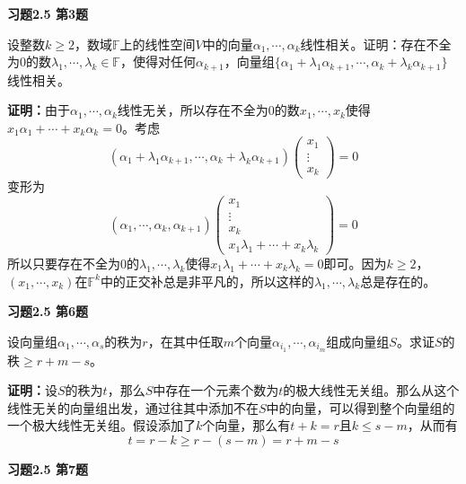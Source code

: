 \renewcommand{\newpageorvspace}{\vspace{2em}}

\date{第五次作业}



\maketitle

{\bf 习题2.5 第3题}

设整数$k\geqslant 2$，数域$\mathbb{F}$上的线性空间$V$中的向量$\alpha_1,\cdots, \alpha_k$线性相关。证明：存在不全为0的数$\lambda_1,\cdots,\lambda_k\in \mathbb{F}$，使得对任何$\alpha_{k+1}$，向量组$\{\alpha_1+\lambda_1\alpha_{k+1}, \cdots, \alpha_k+\lambda_k\alpha_{k+1}\}$线性相关。

{\bf 证明：}由于$\alpha_1,\cdots, \alpha_k$线性无关，所以存在不全为0的数$x_1,\cdots,x_k$使得$x_1\alpha_1+\cdots+x_k\alpha_k = 0$。考虑
$$(\alpha_1+\lambda_1\alpha_{k+1}, \cdots, \alpha_k+\lambda_k\alpha_{k+1}) \begin{pmatrix} x_1 \\ \vdots \\ x_k \end{pmatrix} = 0$$
变形为
$$(\alpha_1, \cdots, \alpha_k, \alpha_{k+1}) \begin{pmatrix} x_1 \\ \vdots \\ x_k \\ x_1\lambda_1+\cdots+x_k\lambda_k \end{pmatrix} = 0$$
所以只要存在不全为0的$\lambda_1,\cdots,\lambda_k$使得$x_1\lambda_1+\cdots+x_k\lambda_k=0$即可。因为$k\geqslant 2$，$(x_1,\cdots,x_k)$在$\mathbb{F}^k$中的正交补总是非平凡的，所以这样的$\lambda_1,\cdots,\lambda_k$总是存在的。

\newpageorvspace

{\bf 习题2.5 第6题}

设向量组$\alpha_1,\cdots,\alpha_s$的秩为$r$，在其中任取$m$个向量$\alpha_{i_1},\cdots,\alpha_{i_m}$组成向量组$S$。求证$S$的秩$\geqslant r+m-s$。

{\bf 证明：}设$S$的秩为$t$，那么$S$中存在一个元素个数为$t$的极大线性无关组。那么从这个线性无关的向量组出发，通过往其中添加不在$S$中的向量，可以得到整个向量组的一个极大线性无关组。假设添加了$k$个向量，那么有$t+k=r$且$k\leqslant s-m$，从而有
$$t = r - k \geqslant r - (s-m) = r+m-s$$

\newpageorvspace

{\bf 习题2.5 第7题}

